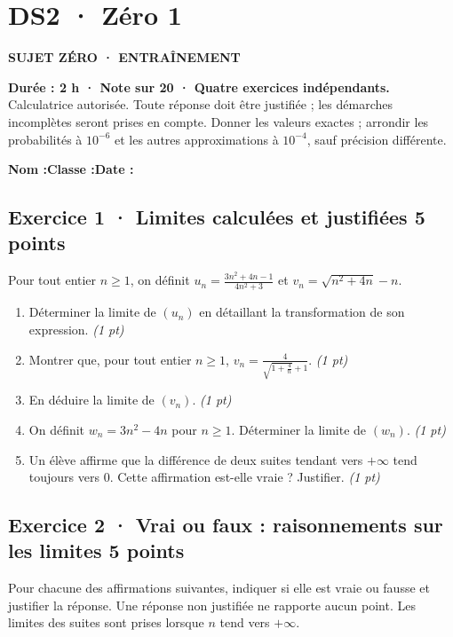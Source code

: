 \clearpage{}\label{sujet:2-1}

\section*{DS2 · Zéro 1}

{\sffamily\bfseries\color{teal}SUJET ZÉRO · ENTRAÎNEMENT\par}

\textbf{Durée : 2 h · Note sur 20 · Quatre exercices indépendants.}\\Calculatrice autorisée. Toute réponse doit être justifiée ; les démarches incomplètes seront prises en compte. Donner les valeurs exactes ; arrondir les probabilités à $10^{-6}$ et les autres approximations à $10^{-4}$, sauf précision différente.

\smallskip\textbf{Nom :}\enspace\dotfill\quad\textbf{Classe :}\enspace\dotfill\quad\textbf{Date :}\enspace\dotfill

\subsection*{Exercice 1 · Limites calculées et justifiées \hfill 5 points}Pour tout entier $n\ge1$, on définit $u_n=\frac{3n^2+4n-1}{4n^2+3}$ et $v_n=\sqrt{n^2+4n}-n$.

\begin{enumerate}

\item Déterminer la limite de $(u_n)$ en détaillant la transformation de son expression. \hfill\textit{(1 pt)}

\item Montrer que, pour tout entier $n\ge1$, $v_n=\frac{4}{\sqrt{1+\frac{4}n}+1}$. \hfill\textit{(1 pt)}

\item En déduire la limite de $(v_n)$. \hfill\textit{(1 pt)}

\item On définit $w_n=3n^2-4n$ pour $n\ge1$. Déterminer la limite de $(w_n)$. \hfill\textit{(1 pt)}

\item Un élève affirme que la différence de deux suites tendant vers $+\infty$ tend toujours vers $0$. Cette affirmation est-elle vraie ? Justifier. \hfill\textit{(1 pt)}

\end{enumerate}

\subsection*{Exercice 2 · Vrai ou faux : raisonnements sur les limites \hfill 5 points}Pour chacune des affirmations suivantes, indiquer si elle est vraie ou fausse et justifier la réponse. Une réponse non justifiée ne rapporte aucun point. Les limites des suites sont prises lorsque $n$ tend vers $+\infty$.

